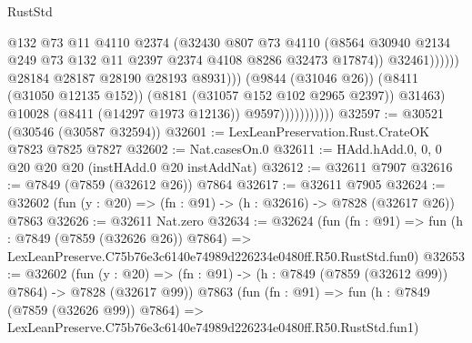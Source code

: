 \begin{lexlean}{RustStd}
\begin{coremodule}
                                              @132
                                              @73
                                              @11
                                              @4110
                                              @2374
                                              (@32430
                                                @807
                                                @73
                                                @4110
                                                (@8564
                                                  @30940
                                                  @2134
                                                  @249
                                                  @73
                                                  @132
                                                  @11
                                                  @2397
                                                  @2374
                                                  @4108
                                                  @8286
                                                  @32473
                                                  @17874))
                                              @32461))))))
                                  @28184
                                  @28187
                                  @28190
                                  @28193
                                  @8931)))
                            (@9844 (@31046 @26))
                            (@8411 (@31050 @12135 @152))
                            (@8181 (@31057 @152 @102 @2965 @2397))
                            @31463)
                          @10028
                          (@8411 (@14297 @1973 @12136))
                          @9597)))))))))))
@32597 := @30521 (@30546 (@30587 @32594))
@32601 := LexLeanPreservation.Rust.CrateOK @7823 @7825 @7827
@32602 := Nat.casesOn.{0}
@32611 := HAdd.hAdd.{0, 0, 0} @20 @20 @20 (instHAdd.{0} @20 instAddNat)
@32612 := @32611 @7907
@32616 := @7849 (@7859 (@32612 @26)) @7864
@32617 := @32611 @7905
@32624 := @32602 (fun (y : @20) => (fn : @91) -> (h : @32616) -> @7828 (@32617 @26)) @7863
@32626 := @32611 Nat.zero
@32634 := @32624
    (fun (fn : @91) =>
    fun (h : @7849 (@7859 (@32626 @26)) @7864) =>
    LexLeanPreserve.C75b76e3c6140e74989d226234e0480ff.R50.RustStd.fun0)
@32653 := @32602
    (fun (y : @20) => (fn : @91) -> (h : @7849 (@7859 (@32612 @99)) @7864) -> @7828 (@32617 @99))
    @7863
    (fun (fn : @91) =>
    fun (h : @7849 (@7859 (@32626 @99)) @7864) =>
    LexLeanPreserve.C75b76e3c6140e74989d226234e0480ff.R50.RustStd.fun1)

\end{coremodule}
\end{lexlean}
